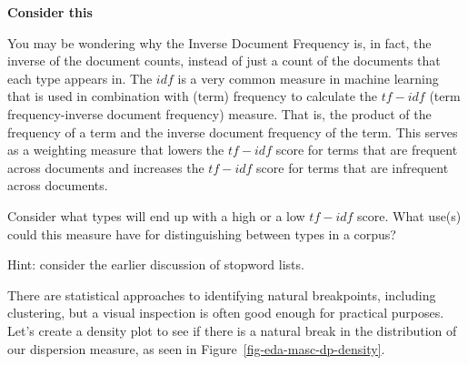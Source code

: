 \documentclass[
  letterpaper,
  DIV=11,
  numbers=noendperiod]{scrreport}
\theoremstyle{definition}
\theoremstyle{remark}
\begin{document}
\begin{tcolorbox}[enhanced jigsaw, leftrule=.75mm, bottomrule=.15mm, opacityback=0, breakable, left=2mm, colback=white, toprule=.15mm, arc=.35mm, rightrule=.15mm]

\textbf{ Consider this}

You may be wondering why the Inverse Document Frequency is, in fact, the
inverse of the document counts, instead of just a count of the documents
that each type appears in. The \(idf\) is a very common measure in
machine learning that is used in combination with (term) frequency to
calculate the \(tf-idf\) (term frequency-inverse document frequency)
measure. That is, the product of the frequency of a term and the inverse
document frequency of the term. This serves as a weighting measure that
lowers the \(tf-idf\) score for terms that are frequent across documents
and increases the \(tf-idf\) score for terms that are infrequent across
documents.

Consider what types will end up with a high or a low \(tf-idf\) score.
What use(s) could this measure have for distinguishing between types in
a corpus?

Hint: consider the earlier discussion of stopword lists.

\end{tcolorbox}

There are statistical approaches to identifying natural breakpoints,
including clustering, but a visual inspection is often good enough for
practical purposes. Let's create a density plot to see if there is a
natural break in the distribution of our dispersion measure, as seen in
Figure~\ref{fig-eda-masc-dp-density}.
\end{document}
